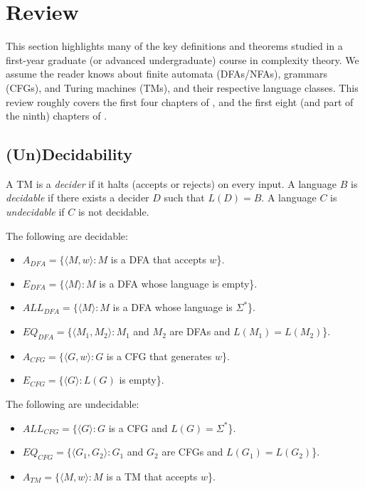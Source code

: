 \section{Review}
\label{sec:review}

This section highlights many of the key definitions and theorems studied in a first-year graduate (or advanced undergraduate) course in complexity theory. We assume the reader knows about finite automata (DFAs/NFAs), grammars (CFGs), and Turing machines (TMs), and their respective language classes. This review roughly covers the first four chapters of \cite{arora_baraz_computational_complexity}, and the first eight (and part of the ninth) chapters of \cite{sipsertheoryofcomp}.

\subsection{(Un)Decidability}

\begin{definition}
A TM is a \emph{decider} if it halts (accepts or rejects) on every input. A language $B$ is \emph{decidable} if there exists a decider $D$ such that $L(D) = B$. A language $C$ is \emph{undecidable} if $C$ is not decidable.
\end{definition}

\begin{theorem}
The following are decidable:
\begin{itemize}
\item $A_{DFA} = \{\langle M, w \rangle : M$ is a DFA that accepts $w$\}.
\item $E_{DFA} = \{\langle M \rangle : M$ is a DFA whose language is empty\}.
\item $ALL_{DFA} = \{\langle M \rangle : M$ is a DFA whose language is $\Sigma^*$\}.
\item $EQ_{DFA} = \{\langle M_1, M_2 \rangle : M_1$ and $M_2$ are DFAs and $L(M_1) = L(M_2)$\}.
\item $A_{CFG} = \{\langle G, w \rangle : G$ is a CFG that generates $w$\}.
\item $E_{CFG} = \{\langle G \rangle : L(G)$ is empty\}.
\end{itemize}
\end{theorem}

\begin{theorem}
The following are undecidable:
\begin{itemize}
\item $ALL_{CFG} = \{\langle G \rangle : G$ is a CFG and $L(G) = \Sigma^*$\}.
\item $EQ_{CFG} = \{\langle G_1, G_2 \rangle : G_1$ and $G_2$ are CFGs and $L(G_1) = L(G_2)$\}.
\item $A_{TM} = \{\langle M, w \rangle : M$ is a TM that accepts $w$\}.
\end{itemize}
\end{theorem}

